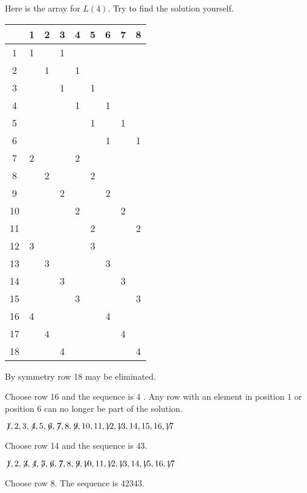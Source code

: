 Here is the array for $L(4)$. Try to find the solution yourself.
\begin{center}
\addtolength{\tabcolsep}{4pt}
\begin{tabular}{|c||c|c|c|c|c|c|c|c|}
\hline
&1&2&3&4&5&6&7&8\\\hline\hline
1&1&&1&&&&&\\\hline
2&&1&&1&&&&\\\hline
3&&&1&&1&&&\\\hline
4&&&&1&&1&&\\\hline
5&&&&&1&&1&\\\hline
6&&&&&&1&&1\\\hline
7&2&&&2&&&&\\\hline
8&&2&&&2&&&\\\hline
9&&&2&&&2&&\\\hline
10&&&&2&&&2&\\\hline
11&&&&&2&&&2\\\hline
12&3&&&&3&&&\\\hline
13&&3&&&&3&&\\\hline
14&&&3&&&&3&\\\hline
15&&&&3&&&&3\\\hline
16&4&&&&&4&&\\\hline
17&&4&&&&&4&\\\hline
18&&&4&&&&&4\\\hline
\end{tabular}
\end{center}
By symmetry row 18 may be eliminated.

\smallskip

\noindent Choose row 16 and the sequence is 4\textvisiblespace\textvisiblespace\textvisiblespace{} \textvisiblespace\textvisiblespace.
Any row with an element in position $1$ or position $6$ can no longer be part of the solution.

$\not\! 1,2,3,\not\! 4,5,\not\! 6,\not\! 7,8,\not\! 9,10,11,\not\!\! 12,\not\!\! 13,14,15,16,\not\!\! 17$

\noindent Choose row 14 and the sequence is 4\textvisiblespace{}3\textvisiblespace.

$\not\! 1,2,\not\! 3,\not\! 4,\not\! 5,\not\! 6,\not\! 7,8,\not\! 9,\not\!\! 10,11,\not\!\! 12,\not\!\! 13,14, \not\!\! 15,16,\not\!\! 17$

\noindent Choose row 8. The sequence is 4{}2{}34{}3\textvisiblespace.

